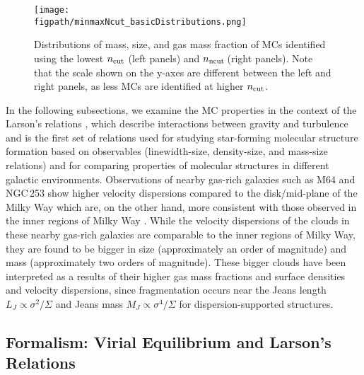 \IfFileExists{emulateapjlegacy.cls}{\documentclass[iop]{emulateapjlegacy}}{\documentclass[iop]{emulateapj}}
\newcommand{\AP}[1]{({\bf \color{apcolor} AP: #1})}
\begin{document}
\begin{figure*}[htbp]
\centering
\texttt{[image: \\figpath/minmaxNcut\_basicDistributions.png]}
\caption{
Distributions of mass, size, and gas mass fraction of MCs identified using 
the lowest $n_{\rm cut}$ (left panels) and $n_{\rm ncut}$\,\cc (right panels).
Note that the scale shown on the y-axes are different between the left and right panels, as less MCs are identified 
at higher $n_{\rm cut}$.
\label{fig:dist}}
\end{figure*}

In the following subsections,
we examine the MC properties in the context of the Larson's relations \citep{Larson81a}, which
describe interactions between gravity and turbulence and is the first set of 
relations used for studying star-forming molecular structure formation based on observables (linewidth-size,
density-size, and mass-size relations) and for comparing properties of molecular structures
in different galactic environments.
Observations of nearby gas-rich galaxies such as M64 and NGC\,253
show higher velocity dispersions compared
to the disk/mid-plane of the Milky Way which are, on the other hand,
more consistent with those observed in the inner regions of
Milky Way \citep{Oka01a, Rosolowsky05a, Heyer09a, Leroy15a}.  %
While the velocity dispersions of the clouds in these nearby gas-rich galaxies are comparable
to the inner regions of Milky Way, they are found to be bigger in size (approximately
an order of magnitude) and mass (approximately two orders of magnitude).
These bigger clouds have been interpreted as a results of their higher gas mass fractions and
surface densities and velocity dispersions, since
fragmentation occurs near the Jeans length $L_J\propto\sigma^2/\Sigma$
and Jeans mass $M_J\propto\sigma^4/\Sigma$
for dispersion-supported structures.

\subsection{Formalism: Virial Equilibrium and Larson's Relations}  \label{sec:PVE}
\end{document}
